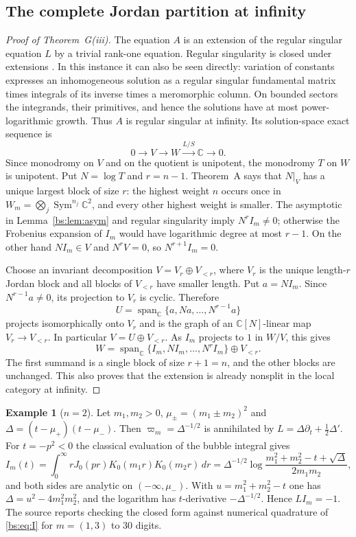 \documentclass[11pt,a4paper]{article}
\theoremstyle{definition}
\newtheorem{example}[theorem]{Example}
\theoremstyle{remark}
\numberwithin{equation}{section}
\newcommand{\C}{\mathbb{C}}
\DeclareMathOperator{\Sym}{Sym}
\begin{document}
\subsection{The complete Jordan partition at infinity}
\begin{proof}[Proof of Theorem~G(iii)]
The equation $A$ is an extension of the regular singular equation $L$ by a trivial rank-one equation. Regular singularity is closed under extensions \cite[Ch.~3]{vdPS03}. In this instance it can also be seen directly: variation of constants expresses an inhomogeneous solution as a regular singular fundamental matrix times integrals of its inverse times a meromorphic column. On bounded sectors the integrands, their primitives, and hence the solutions have at most power-logarithmic growth. Thus $A$ is regular singular at infinity. Its solution-space exact sequence is
\[
0\longrightarrow V\longrightarrow W\xrightarrow{L/S}\C\longrightarrow0.
\]
Since monodromy on $V$ and on the quotient is unipotent, the monodromy $T$ on $W$ is unipotent. Put $N=\log T$ and $r=n-1$. Theorem~A says that $N|_V$ has a unique largest block of size $r$: the highest weight $n$ occurs once in $W_m=\bigotimes_j\Sym^{n_j}\C^2$, and every other highest weight is smaller. The asymptotic in Lemma~\ref{bs:lem:asym} and regular singularity imply $N^r I_m\ne0$; otherwise the Frobenius expansion of $I_m$ would have logarithmic degree at most $r-1$. On the other hand $NI_m\in V$ and $N^rV=0$, so $N^{r+1}I_m=0$.

Choose an invariant decomposition $V=V_r\oplus V_{<r}$, where $V_r$ is the unique length-$r$ Jordan block and all blocks of $V_{<r}$ have smaller length. Put $a=NI_m$. Since $N^{r-1}a\ne0$, its projection to $V_r$ is cyclic. Therefore
\[
U=\operatorname{span}_\C\{a,Na,\ldots,N^{r-1}a\}
\]
projects isomorphically onto $V_r$ and is the graph of an $\C[N]$-linear map $V_r\to V_{<r}$. In particular $V=U\oplus V_{<r}$. As $I_m$ projects to $1$ in $W/V$, this gives
\[
W=\operatorname{span}_\C\{I_m,NI_m,\ldots,N^rI_m\}\oplus V_{<r}.
\]
The first summand is a single block of size $r+1=n$, and the other blocks are unchanged. This also proves that the extension is already nonsplit in the local category at infinity.
\end{proof}

\begin{example}[$n=2$]\label{bs:ex:n2}
Let $m_1,m_2>0$, $\mu_\pm=(m_1\pm m_2)^2$ and $\Delta=(t-\mu_+)(t-\mu_-)$. Then $\varpi_m=\Delta^{-1/2}$ is annihilated by $L=\Delta\partial_t+\frac12\Delta'$. For $t=-p^2<0$ the classical evaluation of the bubble integral gives
\[
I_m(t)=\int_0^\infty rJ_0(pr)K_0(m_1r)K_0(m_2r)\,dr=\Delta^{-1/2}\log\frac{m_1^2+m_2^2-t+\sqrt\Delta}{2m_1m_2},
\]
and both sides are analytic on $(-\infty,\mu_-)$.
With $u=m_1^2+m_2^2-t$ one has $\Delta=u^2-4m_1^2m_2^2$, and the logarithm has $t$-derivative $-\Delta^{-1/2}$. Hence $LI_m=-1$. The source reports checking the closed form against numerical quadrature of \eqref{bs:eq:I} for $m=(1,3)$ to $30$ digits.
\end{example}
\end{document}
